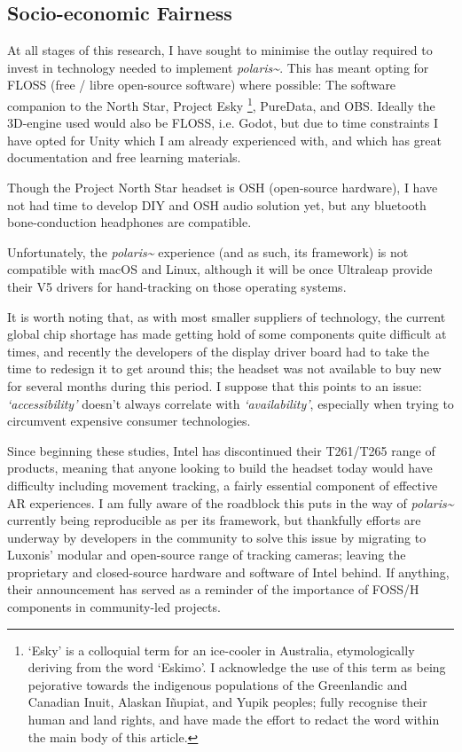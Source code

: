 \subsection{Socio-economic Fairness}\label{sec: polaris-ethics-}
At all stages of this research, I have sought to minimise the outlay required to invest in technology needed to implement \textit{polaris\textasciitilde{}}. This has meant opting for FLOSS (free / libre open-source software) where possible: The software companion to the North Star, Project Esky \footnote{`Esky' is a colloquial term for an ice-cooler in Australia, etymologically deriving from the word `Eskimo'. I acknowledge the use of this term as being pejorative towards the indigenous populations of the Greenlandic and Canadian Inuit, Alaskan Iñupiat, and Yupik peoples; fully recognise their human and land rights, and have made the effort to redact the word within the main body of this article.}, PureData, and OBS. Ideally the 3D-engine used would also be FLOSS, i.e. Godot, but due to time constraints I have opted for Unity which I am already experienced with, and which has great documentation and free learning materials.

Though the Project North Star headset is OSH (open-source hardware), I have not had time to develop DIY and OSH audio solution yet, but any bluetooth bone-conduction headphones are compatible.

Unfortunately, the \textit{polaris\textasciitilde{}} experience (and as such, its framework) is not compatible with macOS and Linux, although it will be once Ultraleap provide their V5 drivers for hand-tracking on those operating systems.

It is worth noting that, as with most smaller suppliers of technology, the current global chip shortage has made getting hold of some components quite difficult at times, and recently the developers of the display driver board had to take the time to redesign it to get around this; the headset was not available to buy new for several months during this period. I suppose that this points to an issue: \textit{`accessibility'} doesn't always correlate with \textit{`availability'}, especially when trying to circumvent expensive consumer technologies.

Since beginning these studies, Intel has discontinued their T261/T265 range of products, meaning that anyone looking to build the headset today would have difficulty including movement tracking, a fairly essential component of effective AR experiences. I am fully aware of the roadblock this puts in the way of \textit{polaris\textasciitilde{}} currently being reproducible as per its framework, but thankfully efforts are underway by developers in the community to solve this issue by migrating to Luxonis' modular and open-source range of tracking cameras; leaving the proprietary and closed-source hardware and software of Intel behind. If anything, their announcement has served as a reminder of the importance of FOSS/H components in community-led projects.

